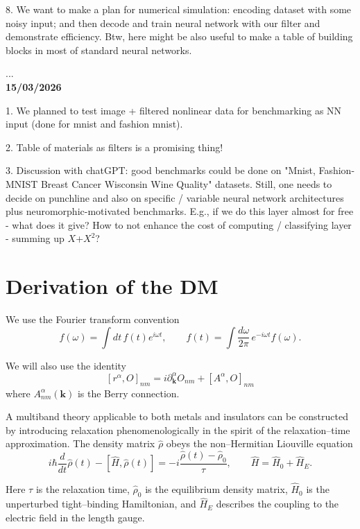 \documentclass[aps, prb, superscriptaddress, longbibliography]{revtex4-2}
\numberwithin{equation}{section}
\begin{document}
8. We want to make a plan for numerical simulation: encoding dataset with some noisy input; and then decode and train neural network with our filter and demonstrate efficiency. Btw, here might be also useful to make a table of building blocks in most of standard neural networks.

...\\
{\bf 15/03/2026}

1. We planned to test image + filtered nonlinear data for benchmarking as NN input (done for mnist and fashion mnist).

2. Table of materials as filters is a promising thing!

3. Discussion with chatGPT: good benchmarks could be done on "Mnist, Fashion-MNIST
Breast Cancer Wisconsin
Wine Quality" datasets. Still, one needs to decide on punchline and also on specific / variable neural network architectures plus neuromorphic-motivated benchmarks. E.g., if we do this layer almost for free - what does it give? How to not enhance the cost of computing / classifying layer - summing up $X$+$X^2$?

\newpage\section{Derivation of the DM}

We use the Fourier transform convention
\begin{equation}
    f(\omega)=\int dt\, f(t)e^{i\omega t},
    \qquad
    f(t)=\int \frac{d\omega}{2\pi}\, e^{-i\omega t}f(\omega).
\end{equation}

We will also use the identity
\begin{equation}\label{rcomm}
\boxed{
[ r^\alpha , O ]_{nm}
=
i\partial^{\alpha}_{\mathbf k} O_{nm}
+
[A^\alpha , O]_{nm}
}
\end{equation}
where $A^\alpha_{nm}(\mathbf k)$ is the Berry connection.

A multiband theory applicable to both metals and insulators can be constructed by introducing relaxation phenomenologically in the spirit of the relaxation–time approximation. The density matrix $\hat\rho$ obeys the non–Hermitian Liouville equation
\begin{equation}\label{eq01}
i\hbar\frac{d}{dt}\hat\rho(t)
-
[\hat H,\hat\rho(t)]
=
-i\frac{\hat\rho(t)-\hat\rho_0}{\tau},
\qquad
\hat H=\hat H_0+\hat H_E .
\end{equation}

Here $\tau$ is the relaxation time, $\hat\rho_0$ is the equilibrium density matrix, $\hat H_0$ is the unperturbed tight–binding Hamiltonian, and $\hat H_E$ describes the coupling to the electric field in the length gauge.
\end{document}
